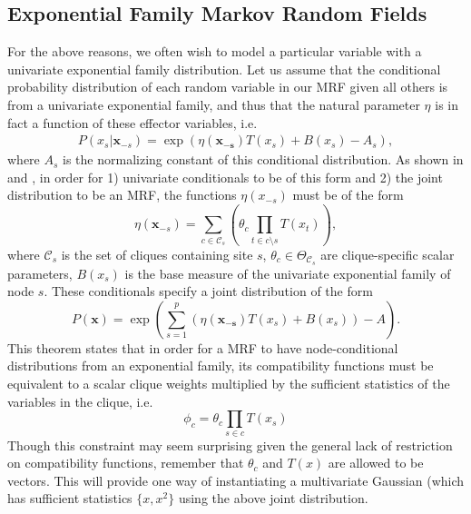 \documentclass{samkoelleprelimworking}
\begin{document}
\subsection{Exponential Family Markov Random Fields}

For the above reasons, we often wish to model a particular variable with a univariate exponential family distribution.  Let us assume that the conditional probability distribution of each random variable in our MRF given all others is from a univariate exponential family, and thus that the natural parameter $\eta$ is in fact a function of these effector variables, i.e.
\begin{align}
P(x_s \vert \bm{x}_{-s}) = \exp(\eta(\bm{x_{-s}}) T(x_s) + B(x_s) - A_s), 
\end{align}
where $A_s$ is the normalizing constant of this conditional distribution.  As shown in \citep{Besag1974-qb} and \citep{Yang2013-wa}, in order for 1) univariate conditionals to be of this form and 2) the joint distribution to be an MRF, the functions $\eta (x_{-s})$ must be of the form
\[\eta (\bm{x}_{-s}) = \sum_{c \in \mathcal{C}_s} (\theta_c \prod_{t \in c \setminus s } T(x_t) )   ,\]
where $\mathcal{C}_s$ is the set of cliques containing site $s$, $\theta_c \in \Theta_{\mathcal{C}_s}$ are clique-specific scalar parameters, $B(x_s)$ is the base measure of the univariate exponential family of node $s$.  These conditionals specify a joint distribution of the form \[P(\bm{x}) = \exp(\sum_{s=1}^p (\eta(\bm{x_{-s}}) T(x_s) + B(x_s)) - A).\]
This theorem states that in order for a MRF to have node-conditional distributions from an exponential family, its compatibility functions must be equivalent to a scalar clique weights multiplied by the sufficient statistics of the variables in the clique, i.e.
\[\phi_c = \theta_c \prod_{s \in c} T(x_s)\]
Though this constraint may seem surprising given the general lack of restriction on compatibility functions, remember that $\theta_c$ and $T(x)$ are allowed to be vectors.  This will provide one way of instantiating a multivariate Gaussian (which has sufficient statistics $\{x, x^2\}$ using the above joint distribution.
\end{document}
